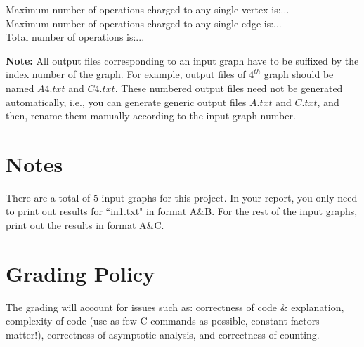 \documentclass{article}
\begin{document}
\noindent Maximum number of operations charged to any single vertex is:...\\
Maximum number of operations charged to any single edge is:...\\
Total number of operations is:...\\

\par{\textbf{Note:}} All output files corresponding to an input graph have to be suffixed by the index number of the graph. For example, output files of $4^{th}$ graph should be named $A4.txt$ and $C4.txt$. These numbered output files need not be generated automatically, i.e., you can generate generic output files $A.txt$ and $C.txt$, and then, rename them manually according to the input graph number.

\section{Notes}
There are a total of $5$ input graphs for this project. In your report, you only need to print out results for ``in1.txt" in format A\&B. For the rest of the input graphs, print out the results in format A\&C.

\section{Grading Policy}
The grading will account for issues such as: correctness of code \& explanation, complexity of code (use as few C commands as possible, constant factors matter!), correctness of asymptotic analysis, and correctness of counting.
\end{document}
